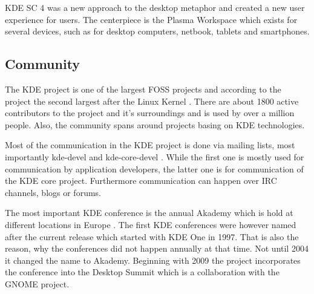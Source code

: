 \ac{KDE SC} 4 was a new approach to the desktop metaphor and created a new user
experience for users. The centerpiece is the Plasma Workspace which exists for
several devices, such as for desktop computers, netbook, tablets and
smartphones.


\subsection{Community} %
\label{sub:Community}

The KDE project is one of the largest FOSS projects and according to the
project the second largest after the Linux Kernel \cite{KDEPress}. There are
about 1800 active contributors to the project and it's surroundings and is used
by over a million people. Also, the community spans around projects basing on
KDE technologies.

Most of the communication in the KDE project is done via mailing lists, most
importantly kde-devel and kde-core-devel
\cite{KDEProjectManagement,KDEContribute}. While the first one is mostly used
for communication by application developers, the latter one is for
communication of the KDE core project. Furthermore communication can happen
over \ac{IRC} channels, blogs or forums.

The most important KDE conference is the annual Akademy which is hold at
different locations in Europe \cite{KDEHistory}. The first KDE conferences were
however named after the current release which started with KDE One in 1997.
That is also the reason, why the conferences did not happen annually at that
time. Not until 2004 it changed the name to Akademy. Beginning with 2009 the
project incorporates the conference into the Desktop Summit which is a
collaboration with the GNOME project.

